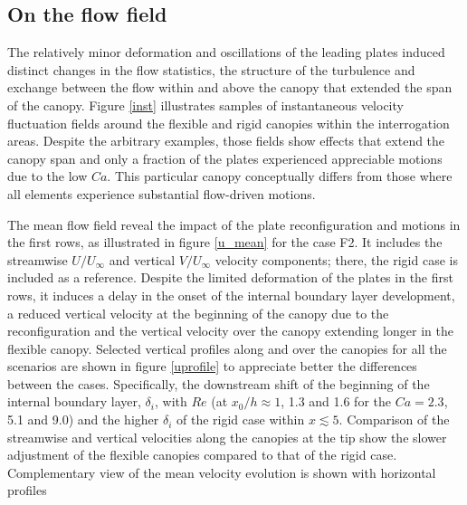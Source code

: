 \documentclass[lineno,authoryear]{FLO_v1}%
\theoremstyle{definition}
\begin{document}
\subsection{On the flow field}

The relatively minor deformation and oscillations of the leading plates induced distinct changes in the flow statistics, the structure of the turbulence and exchange between the flow within and above the canopy that extended the span of the canopy. Figure \ref{inst} illustrates samples of instantaneous velocity fluctuation fields around the flexible and rigid canopies within the interrogation areas. Despite the arbitrary examples, those fields show effects that extend the canopy span and only a fraction of the plates experienced appreciable motions due to the low $Ca$. This particular canopy conceptually differs from those where all elements experience substantial flow-driven motions. 

The mean flow field reveal the impact of the plate reconfiguration and motions in the first rows, as illustrated in figure \ref{u_mean} for the case F2. It includes the streamwise $U/U_{\infty}$ and vertical $V/U_{\infty}$ velocity components; there, the rigid case is included as a reference. Despite the limited deformation of the plates in the first rows, it induces a delay in the onset of the internal boundary layer development, a reduced vertical velocity at the beginning of the canopy due to the reconfiguration and the vertical velocity over the canopy extending longer in the flexible canopy. Selected vertical profiles along and over the canopies for all the scenarios are shown in figure \ref{uprofile} to appreciate better the differences between the cases. Specifically, the downstream shift of the beginning of the internal boundary layer, $\delta_i$, with $Re$ (at $x_0/h\approx 1$, 1.3 and 1.6 for the $Ca=2.3$, 5.1 and 9.0) and the higher $\delta_i$ of the rigid case within $x\lesssim 5$. Comparison of the streamwise and vertical velocities along the canopies at the tip show the slower adjustment of the flexible canopies compared to that of the rigid case. Complementary view of the mean velocity evolution is shown with horizontal profiles 
\end{document}
